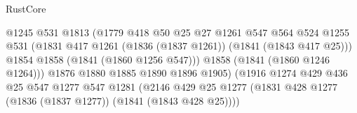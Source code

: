 \begin{lexlean}{RustCore}
\begin{coremodule}
                                              @1245
                                              @531
                                              @1813
                                              (@1779
                                                @418
                                                @50
                                                @25
                                                @27
                                                @1261
                                                @547
                                                @564
                                                @524
                                                @1255
                                                @531
                                                (@1831
                                                  @417
                                                  @1261
                                                  (@1836 (@1837 @1261))
                                                  (@1841 (@1843 @417 @25)))
                                                @1854
                                                @1858
                                                (@1841 (@1860 @1256 @547)))
                                              @1858
                                              (@1841 (@1860 @1246 @1264)))
                                            @1876
                                            @1880
                                            @1885
                                            @1890
                                            @1896
                                            @1905)
                                          (@1916
                                            @1274
                                            @429
                                            @436
                                            @25
                                            @547
                                            @1277
                                            @547
                                            @1281
                                            (@2146
                                              @429
                                              @25
                                              @1277
                                              (@1831
                                                @428
                                                @1277
                                                (@1836 (@1837 @1277))
                                                (@1841 (@1843 @428 @25))))

\end{coremodule}
\end{lexlean}
